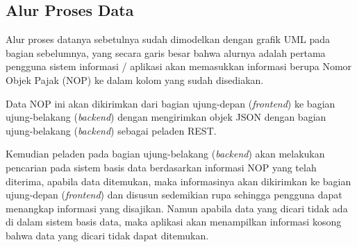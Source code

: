 \documentclass[pdftex,12pt, oneside]{article}
\begin{document}
\subsection{Alur Proses Data}

Alur proses datanya sebetulnya sudah dimodelkan dengan grafik UML pada bagian sebelumnya, yang secara garis besar bahwa alurnya adalah pertama pengguna sistem informasi / aplikasi akan memasukkan informasi berupa Nomor Objek Pajak (NOP) ke dalam kolom yang sudah disediakan.

Data NOP ini akan dikirimkan dari bagian ujung-depan (\textit{frontend}) ke bagian ujung-belakang (\textit{backend}) dengan mengirimkan objek JSON dengan bagian ujung-belakang (\textit{backend}) sebagai peladen REST.

Kemudian peladen pada bagian ujung-belakang (\textit{backend}) akan melakukan pencarian pada sistem basis data berdasarkan informasi NOP yang telah diterima, apabila data ditemukan, maka informasinya akan dikirimkan ke bagian ujung-depan (\textit{frontend}) dan disusun sedemikian rupa sehingga pengguna dapat menangkap informasi yang disajikan. Namun apabila data yang dicari tidak ada di dalam sistem basis data, maka aplikasi akan menampilkan informasi kosong bahwa data yang dicari tidak dapat ditemukan.
\end{document}
